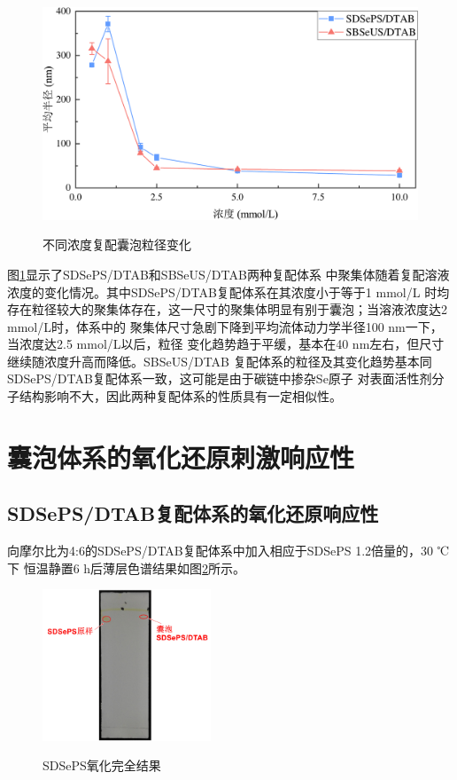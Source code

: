 \documentclass[bachelor,winfonts,replaceperiod]{jnuthesis}
\begin{document}
    \begin{figure}[htbp]
        \centering
        \includegraphics[width=.67\textwidth]{Figure/vesicle-concentration-line.pdf}\\
        \caption{不同浓度复配囊泡粒径变化}\label{fig:vesicle-concentration-line}
    \end{figure}
    
    图\ref{fig:vesicle-concentration-line}显示了SDSePS/DTAB和SBSeUS/DTAB两种复配体系
    中聚集体随着复配溶液浓度的变化情况。其中SDSePS/DTAB复配体系在其浓度小于等于1 mmol/L
    时均存在粒径较大的聚集体存在，这一尺寸的聚集体明显有别于囊泡；当溶液浓度达2 mmol/L时，体系中的
    聚集体尺寸急剧下降到平均流体动力学半径100 nm一下，当浓度达2.5 mmol/L以后，粒径
    变化趋势趋于平缓，基本在40 nm左右，但尺寸继续随浓度升高而降低。SBSeUS/DTAB
    复配体系的粒径及其变化趋势基本同SDSePS/DTAB复配体系一致，这可能是由于碳链中掺杂Se原子
    对表面活性剂分子结构影响不大，因此两种复配体系的性质具有一定相似性。
        
    \section{囊泡体系的氧化还原刺激响应性}
    \subsection{SDSePS/DTAB复配体系的氧化还原响应性}
    向摩尔比为4:6的SDSePS/DTAB复配体系中加入相应于SDSePS 1.2倍量的，30 ℃下
    恒温静置6 h后薄层色谱结果如图\ref{fig:SDSePS-Ox-tlc}所示。
    \begin{figure}[htbp]
        \centering
        \includegraphics[height=4.5cm]{figure/SDSePS-Ox-tlc.jpg}\\
        \caption{SDSePS氧化完全结果}\label{fig:SDSePS-Ox-tlc}
    \end{figure}
    
\end{document}

